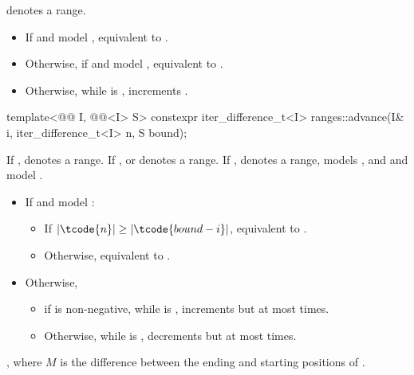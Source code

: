\begin{itemdescr}
\pnum
\expects
{} denotes a range.

\pnum
\effects
\begin{itemize}
\item If  and  model ,
  equivalent to .
\item Otherwise, if  and  model ,
  equivalent to .
\item Otherwise, while  is ,
  increments .
\end{itemize}
\end{itemdescr}

%
\begin{itemdecl}
template<@@ I, @@<I> S>
  constexpr iter_difference_t<I> ranges::advance(I& i, iter_difference_t<I> n, S bound);
\end{itemdecl}

\begin{itemdescr}
\pnum
\expects
If ,  denotes a range.
If ,  or  denotes a range.
If ,  denotes a range,
 models , and
 and  model .

\pnum
\effects
\begin{itemize}
\item If  and  model :
  \begin{itemize}
  \item If \brk{}$|\tcode{n}| \ge |\tcode{bound - i}|$,
    equivalent to .
  \item Otherwise, equivalent to .
  \end{itemize}
\item Otherwise,
  \begin{itemize}
  \item if  is non-negative,
    while  is ,
    increments  but at most  times.
  \item Otherwise,
    while  is ,
    decrements  but at most  times.
  \end{itemize}
\end{itemize}

\pnum
\returns
{}, where $M$ is the difference between
the ending and starting positions of .
\end{itemdescr}

